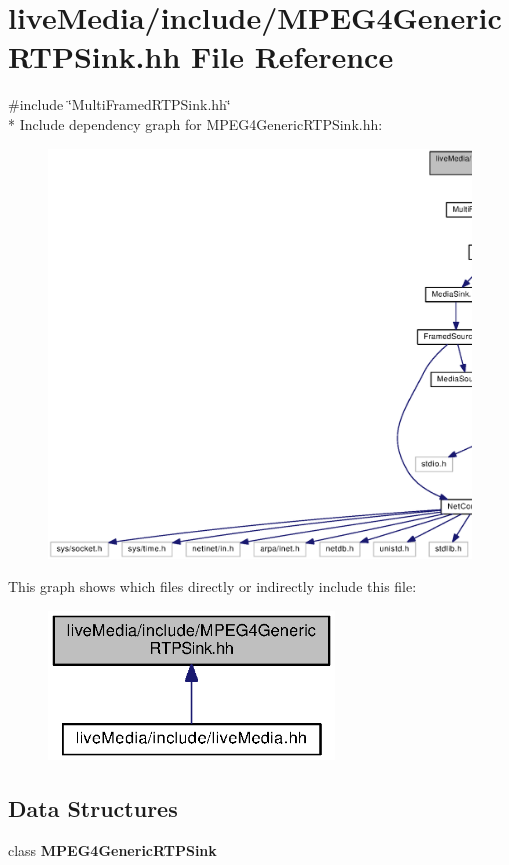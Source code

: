 \section{live\+Media/include/\+M\+P\+E\+G4\+Generic\+R\+T\+P\+Sink.hh File Reference}
\label{MPEG4GenericRTPSink_8hh}
{\ttfamily \#include \char`\"{}Multi\+Framed\+R\+T\+P\+Sink.\+hh\char`\"{}}\\*
Include dependency graph for M\+P\+E\+G4\+Generic\+R\+T\+P\+Sink.\+hh\+:
\nopagebreak
\begin{figure}[H]
\begin{center}
\leavevmode
\includegraphics[width=350pt]{MPEG4GenericRTPSink_8hh__incl}
\end{center}
\end{figure}
This graph shows which files directly or indirectly include this file\+:
\nopagebreak
\begin{figure}[H]
\begin{center}
\leavevmode
\includegraphics[width=215pt]{MPEG4GenericRTPSink_8hh__dep__incl}
\end{center}
\end{figure}
\subsection*{Data Structures}
\begin{DoxyCompactItemize}
\item 
class {\bf M\+P\+E\+G4\+Generic\+R\+T\+P\+Sink}
\end{DoxyCompactItemize}
